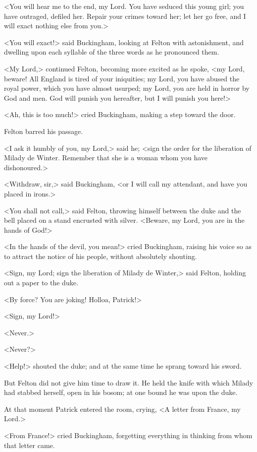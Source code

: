 <You will hear me to the end, my Lord. You have seduced this young girl; you have outraged, defiled her. Repair your crimes toward her; let her go free, and I will exact nothing else from you.> 

<You will exact!> said Buckingham, looking at Felton with astonishment, and dwelling upon each syllable of the three words as he pronounced them. 

<My Lord,> continued Felton, becoming more excited as he spoke, <my Lord, beware! All England is tired of your iniquities; my Lord, you have abused the royal power, which you have almost usurped; my Lord, you are held in horror by God and men. God will punish you hereafter, but I will punish you here!> 

<Ah, this is too much!> cried Buckingham, making a step toward the door. 

Felton barred his passage. 

<I ask it humbly of you, my Lord,> said he; <sign the order for the liberation of Milady de Winter. Remember that she is a woman whom you have dishonoured.> 

<Withdraw, sir,> said Buckingham, <or I will call my attendant, and have you placed in irons.> 

<You shall not call,> said Felton, throwing himself between the duke and the bell placed on a stand encrusted with silver. <Beware, my Lord, you are in the hands of God!> 

<In the hands of the devil, you mean!> cried Buckingham, raising his voice so as to attract the notice of his people, without absolutely shouting. 

<Sign, my Lord; sign the liberation of Milady de Winter,> said Felton, holding out a paper to the duke. 

<By force? You are joking! Holloa, Patrick!> 

<Sign, my Lord!> 

<Never.> 

<Never?> 

<Help!> shouted the duke; and at the same time he sprang toward his sword. 

But Felton did not give him time to draw it. He held the knife with which Milady had stabbed herself, open in his bosom; at one bound he was upon the duke. 

At that moment Patrick entered the room, crying, <A letter from France, my Lord.> 

<From France!> cried Buckingham, forgetting everything in thinking from whom that letter came. 


